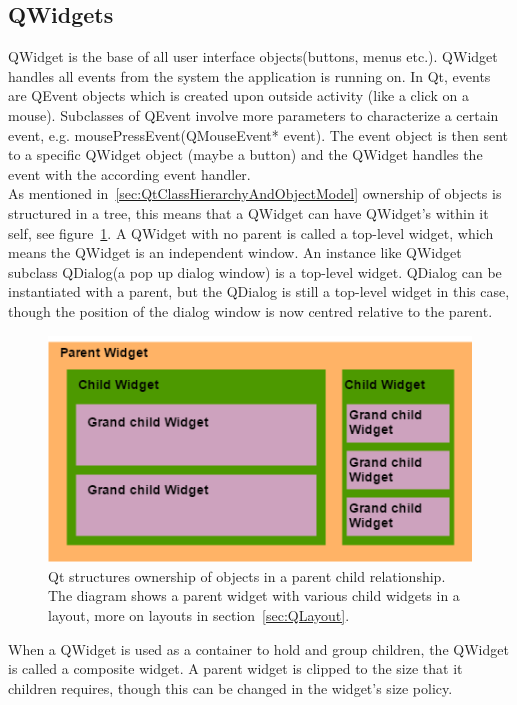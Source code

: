 \subsection{QWidgets}
\label{sec:qwidgets}
QWidget is the base of all user interface objects(buttons, menus etc.). QWidget handles all events from the system the application is running on. In Qt, events are QEvent objects which is created upon outside activity (like a click on a mouse). Subclasses of QEvent involve more parameters to characterize a certain event, e.g. mousePressEvent(QMouseEvent* event). The event object is then sent to a specific QWidget object (maybe a button) and the QWidget handles the event with the according event handler.\\

As mentioned in~\ref{sec:QtClassHierarchyAndObjectModel} ownership of objects is structured in a tree, this means that a QWidget can have QWidget's within it self, see figure~\ref{fig:QWidgetExample}. A QWidget with no parent is called a top-level widget, which means the QWidget is an independent window. An instance like QWidget subclass QDialog(a pop up dialog window) is a top-level widget. QDialog can be instantiated with a parent, but the QDialog is still a top-level widget in this case, though the position of the dialog window is now centred relative to the parent.

\begin{figure}[h]
	\centering
	\includegraphics[scale=0.55]{Figures/QWidgetExample.png}
	\caption{Qt structures ownership of objects in a parent child relationship. The diagram shows a parent widget with various child widgets in a layout, more on layouts in section~\ref{sec:QLayout}.}
	\label{fig:QWidgetExample}
\end{figure}

When a QWidget is used as a container to hold and group children, the QWidget is called a composite widget. A parent widget is clipped to the size that it children requires, though this can be changed in the widget's size policy. 

